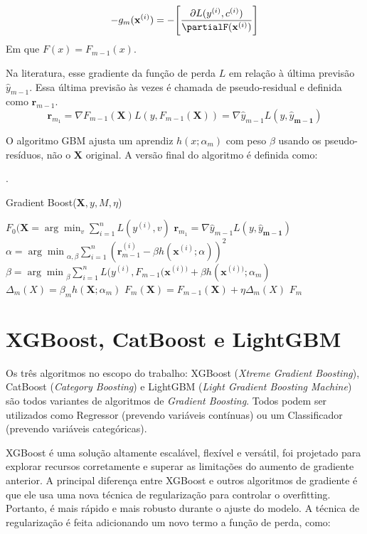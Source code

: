 \begin{equation}
    -g_m(\mathbf{x}^{(i)}) = -\Bigg[\frac{\partial L(y^{(i)},c^{(i)})}{\partialF(\mathbf{x}^{(i)})}\Bigg]
\end{equation}
Em que $F(x)=F_{m-1}(x)$.

Na literatura, esse gradiente da função de perda $L$ em relação à última previsão $\hat{y}_{m−1}$. Essa última previsão às vezes é chamada de pseudo-residual e definida como $\mathbf{r}_{m-1}$. 
\begin{equation}
    \mathbf{r}_{m_1} = \nabla F_{m-1}(\mathbf{X})L(y,F_{m-1}(\mathbf{X})) = \nabla \hat{y}_{m-1}L(y,\hat{y}_{\mathbf{m-1}})
\end{equation}

O algoritmo GBM ajusta um aprendiz $h(x;\alpha_m)$ com peso $\beta$ usando os pseudo-resíduos, não o $\mathbf{X}$ original. A versão final do algoritmo é definida como:

\cite{hastie,greedy}.
\begin{algorithm}[H]
\caption{Gradient Boost($\mathbf{X},y,M,\eta$)}\label{algoritmo:gradboost}
\begin{algorithmic}[1]
\State $F_0(\mathbf{X} = \arg\min_v\sum_{i=1}^n L(y^{(i)},v)$
\State {}
\State $\mathbf{r}_{m_1} = \nabla \hat{y}_{m-1}L(y,\hat{y}_{\mathbf{m-1}})$ 
\State $\alpha = {\arg\min}_{\alpha,\beta}\sum_{i=1}^n(\mathbf{r}_{m-1}^{(i)}-\beta h(\mathbf{x}^{(i)};\alpha))^2$
\State $\beta = {\arg\min}_{\beta}\sum_{i=1}^nL(y^{(i)},F_{m-1}(\mathbf{x}^{(i))}+\beta h(\mathbf{x}^{(i))};\alpha_m)$
\State $\Delta_m(X) = \beta_mh(\mathbf{X};\alpha_m)$
\State $F_m(\mathbf{X}) = F_{m-1}(\mathbf{X}) + \eta \Delta_m(X)$
\EndFor
\State \Return $F_m$
\end{algorithmic}
\end{algorithm}

\section{XGBoost, CatBoost e LightGBM}
Os três algoritmos no escopo do trabalho: XGBoost (\textit{Xtreme Gradient Boosting}), CatBoost (\textit{Category Boosting}) e LightGBM (\textit{Light Gradient Boosting Machine}) são todos variantes de algoritmos de \textit{Gradient Boosting}. Todos podem ser utilizados como Regressor (prevendo variáveis contínuas) ou um Classificador (prevendo variáveis categóricas).

XGBoost é uma solução altamente escalável, flexível e versátil, foi projetado para explorar recursos corretamente e superar as limitações do aumento de gradiente anterior. A principal diferença entre XGBoost e outros algoritmos de gradiente é que ele usa uma nova técnica de regularização para controlar o overfitting. Portanto,
é mais rápido e mais robusto durante o ajuste do modelo. A técnica de regularização é feita adicionando um novo termo a função de perda, como:

